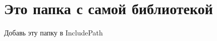 \chapter{Это папка с самой библиотекой}
\hypertarget{md__f_1_2_kolibri_os_2_kolibri_o_s-_cpp-_lib_2src_2include_2_readme}{}\label{md__f_1_2_kolibri_os_2_kolibri_o_s-_cpp-_lib_2src_2include_2_readme}
\label{md__f_1_2_kolibri_os_2_kolibri_o_s-_cpp-_lib_2src_2include_2_readme_autotoc_md2}%
%
 Добавь эту папку в Include\+Path 